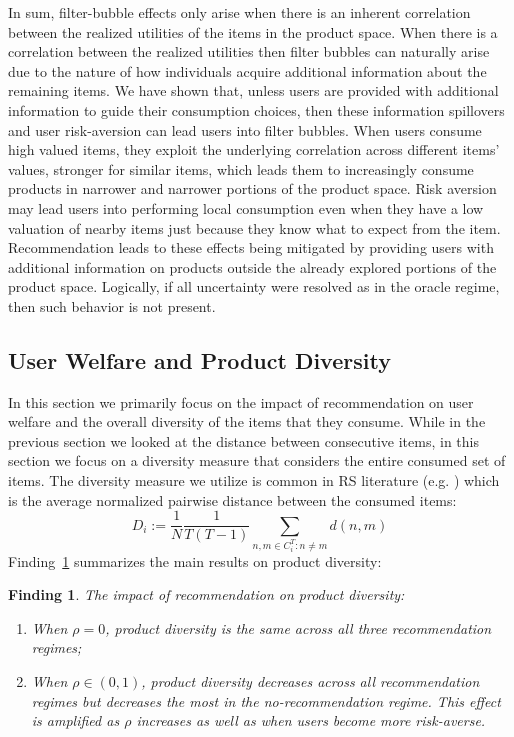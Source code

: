 \documentclass[manuscript]{acmart}
\newtheorem{finding}{Finding}
\begin{document}
In sum, filter-bubble effects only arise when there is an inherent correlation between the realized utilities of the items in the product space. When there is a correlation between the realized utilities then filter bubbles can naturally arise due to the nature of how individuals acquire additional information about the remaining items. We have shown that, unless users are provided with additional information to guide their consumption choices, then these information spillovers and user risk-aversion can lead users into filter bubbles. When users consume high valued items, they exploit the underlying correlation across different items' values, stronger for similar items, which leads them to increasingly consume products in narrower and narrower portions of the product space. Risk aversion may lead users into performing local consumption even when they have a low valuation of nearby items just because they know what to expect from the item. Recommendation leads to these effects being mitigated by providing users with additional information on products outside the already explored portions of the product space. Logically, if all uncertainty were resolved as in the oracle regime, then such behavior is not present.


\subsection{User Welfare and Product Diversity}

In this section we primarily focus on the impact of recommendation on user welfare and the overall diversity of the items that they consume. While in the previous section we looked at the distance between consecutive items, in this section we focus on a diversity measure that considers the entire consumed set of items. The diversity measure we utilize is common in RS literature (e.g. \cite{ziegler2005improving}) which is the average normalized pairwise distance between the consumed items:
$$D_i:=\frac{1}{N}\frac{1}{T(T-1)}\sum_{n,m \in C_i^T: n \ne m} d(n,m)$$
\noindent 
Finding~\ref{finding_diversity} summarizes the main results on product diversity:
\begin{finding}\label{finding_diversity}
The impact of recommendation on product diversity:
\begin{enumerate}
\item When $\rho = 0$, product diversity is the same across all three recommendation regimes;
\item When $\rho \in (0,1)$, product diversity decreases across all recommendation regimes but decreases the most in the no-recommendation regime. This effect is amplified as $\rho$ increases as well as when users become more risk-averse.
\end{enumerate}
\end{finding}
\par 
\end{document}
